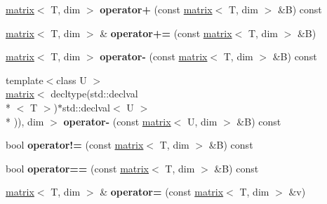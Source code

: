 \begin{DoxyCompactItemize}
\item 
\hypertarget{classkeycpp_1_1matrix_ada7a8a25fb314072a6bc59ed7bda8867}{\hyperlink{classkeycpp_1_1matrix}{matrix}$<$ T, dim $>$ {\bfseries operator+} (const \hyperlink{classkeycpp_1_1matrix}{matrix}$<$ T, dim $>$ \&B) const }\label{classkeycpp_1_1matrix_ada7a8a25fb314072a6bc59ed7bda8867}

\item 
\hypertarget{classkeycpp_1_1matrix_a2eebddb2db3156a8d05fe0baf9fc396e}{\hyperlink{classkeycpp_1_1matrix}{matrix}$<$ T, dim $>$ \& {\bfseries operator+=} (const \hyperlink{classkeycpp_1_1matrix}{matrix}$<$ T, dim $>$ \&B)}\label{classkeycpp_1_1matrix_a2eebddb2db3156a8d05fe0baf9fc396e}

\item 
\hypertarget{classkeycpp_1_1matrix_a8656b3861c657c6425c226ed8581a2da}{\hyperlink{classkeycpp_1_1matrix}{matrix}$<$ T, dim $>$ {\bfseries operator-\/} (const \hyperlink{classkeycpp_1_1matrix}{matrix}$<$ T, dim $>$ \&B) const }\label{classkeycpp_1_1matrix_a8656b3861c657c6425c226ed8581a2da}

\item 
\hypertarget{classkeycpp_1_1matrix_aa4e52087fbf70c471a215981e84682cd}{{\footnotesize template$<$class U $>$ }\\\hyperlink{classkeycpp_1_1matrix}{matrix}$<$ decltype(std\-::declval\\*
$<$ T $>$)$\ast$std\-::declval$<$ U $>$\\*
)), dim $>$ {\bfseries operator-\/} (const \hyperlink{classkeycpp_1_1matrix}{matrix}$<$ U, dim $>$ \&B) const }\label{classkeycpp_1_1matrix_aa4e52087fbf70c471a215981e84682cd}

\item 
\hypertarget{classkeycpp_1_1matrix_aeff29be0826cee275df82ce9e109873f}{bool {\bfseries operator!=} (const \hyperlink{classkeycpp_1_1matrix}{matrix}$<$ T, dim $>$ \&B) const }\label{classkeycpp_1_1matrix_aeff29be0826cee275df82ce9e109873f}

\item 
\hypertarget{classkeycpp_1_1matrix_a81a97884f2b968ecc48a44c057a4d018}{bool {\bfseries operator==} (const \hyperlink{classkeycpp_1_1matrix}{matrix}$<$ T, dim $>$ \&B) const }\label{classkeycpp_1_1matrix_a81a97884f2b968ecc48a44c057a4d018}

\item 
\hypertarget{classkeycpp_1_1matrix_a0e46bd1a6676c8f43e18c4090db04f06}{\hyperlink{classkeycpp_1_1matrix}{matrix}$<$ T, dim $>$ \& {\bfseries operator=} (const \hyperlink{classkeycpp_1_1matrix}{matrix}$<$ T, dim $>$ \&v)}\label{classkeycpp_1_1matrix_a0e46bd1a6676c8f43e18c4090db04f06}


\end{DoxyCompactItemize}
